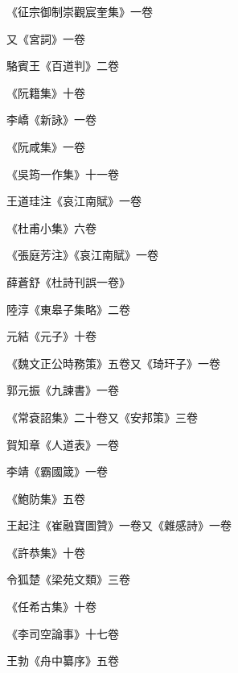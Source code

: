 \begin{pinyinscope}
 《征宗御制崇觀宸奎集》一卷



 又《宮詞》一卷



 駱賓王《百道判》二卷



 《阮籍集》十卷



 李嶠《新詠》一卷



 《阮咸集》一卷



 《吳筠一作集》十一卷



 王道珪注《哀江南賦》一卷



 《杜甫小集》六卷



 《張庭芳注》《哀江南賦》一卷



 薛蒼舒《杜詩刊誤一卷》



 陸淳《東皋子集略》二卷



 元結《元子》十卷



 《魏文正公時務策》五卷又《琦玕子》一卷



 郭元振《九諫書》一卷



 《常袞詔集》二十卷又《安邦策》三卷



 賀知章《人道表》一卷



 李靖《霸國箴》一卷



 《鮑防集》五卷



 王起注《崔融寶圖贊》一卷又《雜感詩》一卷



 《許恭集》十卷



 令狐楚《梁苑文類》三卷



 《任希古集》十卷



 《李司空論事》十七卷



 王勃《舟中纂序》五卷




\end{pinyinscope}
